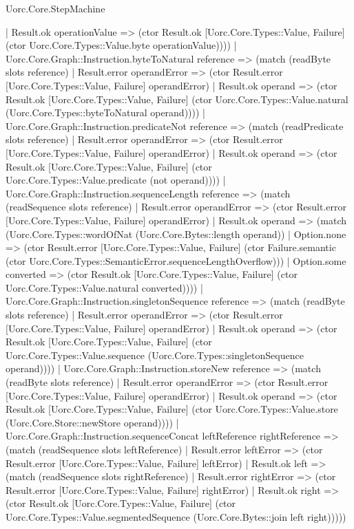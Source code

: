 \begin{lexlean}{Uorc.Core.StepMachine}
\begin{semanticmodule}
{        | Result.ok operationValue => (ctor Result.ok [Uorc.Core.Types::Value, Failure] (ctor Uorc.Core.Types::Value.byte operationValue))))
    | Uorc.Core.Graph::Instruction.byteToNatural reference => (match (readByte slots reference)
      | Result.error operandError => (ctor Result.error [Uorc.Core.Types::Value, Failure] operandError)
      | Result.ok operand => (ctor Result.ok [Uorc.Core.Types::Value, Failure] (ctor Uorc.Core.Types::Value.natural (Uorc.Core.Types::byteToNatural operand))))
    | Uorc.Core.Graph::Instruction.predicateNot reference => (match (readPredicate slots reference)
      | Result.error operandError => (ctor Result.error [Uorc.Core.Types::Value, Failure] operandError)
      | Result.ok operand => (ctor Result.ok [Uorc.Core.Types::Value, Failure] (ctor Uorc.Core.Types::Value.predicate (not operand))))
    | Uorc.Core.Graph::Instruction.sequenceLength reference => (match (readSequence slots reference)
      | Result.error operandError => (ctor Result.error [Uorc.Core.Types::Value, Failure] operandError)
      | Result.ok operand => (match (Uorc.Core.Types::wordOfNat (Uorc.Core.Bytes::length operand))
        | Option.none => (ctor Result.error [Uorc.Core.Types::Value, Failure] (ctor Failure.semantic (ctor Uorc.Core.Types::SemanticError.sequenceLengthOverflow)))
        | Option.some converted => (ctor Result.ok [Uorc.Core.Types::Value, Failure] (ctor Uorc.Core.Types::Value.natural converted))))
    | Uorc.Core.Graph::Instruction.singletonSequence reference => (match (readByte slots reference)
      | Result.error operandError => (ctor Result.error [Uorc.Core.Types::Value, Failure] operandError)
      | Result.ok operand => (ctor Result.ok [Uorc.Core.Types::Value, Failure] (ctor Uorc.Core.Types::Value.sequence (Uorc.Core.Types::singletonSequence operand))))
    | Uorc.Core.Graph::Instruction.storeNew reference => (match (readByte slots reference)
      | Result.error operandError => (ctor Result.error [Uorc.Core.Types::Value, Failure] operandError)
      | Result.ok operand => (ctor Result.ok [Uorc.Core.Types::Value, Failure] (ctor Uorc.Core.Types::Value.store (Uorc.Core.Store::newStore operand))))
    | Uorc.Core.Graph::Instruction.sequenceConcat leftReference rightReference => (match (readSequence slots leftReference)
      | Result.error leftError => (ctor Result.error [Uorc.Core.Types::Value, Failure] leftError)
      | Result.ok left => (match (readSequence slots rightReference)
        | Result.error rightError => (ctor Result.error [Uorc.Core.Types::Value, Failure] rightError)
        | Result.ok right => (ctor Result.ok [Uorc.Core.Types::Value, Failure] (ctor Uorc.Core.Types::Value.segmentedSequence (Uorc.Core.Bytes::join left right)))))
}
\end{semanticmodule}
\end{lexlean}
